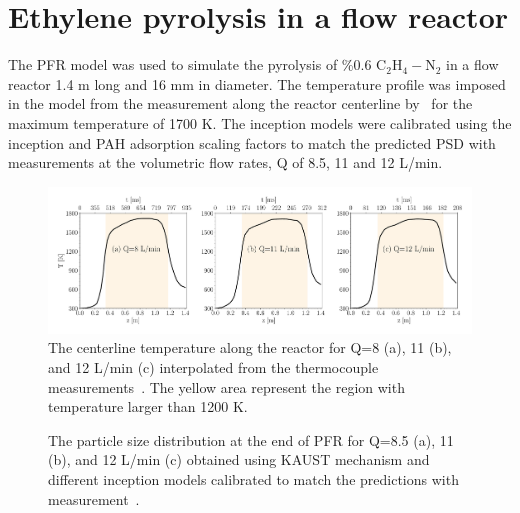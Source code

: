 \section{Ethylene pyrolysis in a flow reactor}
The PFR model was used to simulate the pyrolysis of \%0.6 $\mathrm{C_2H_4-N_2}$ in a flow reactor 1.4 m long and 16 mm in diameter. The temperature profile was imposed in the model from the measurement along the reactor centerline by~\citet{mei2019quantitative} for the maximum temperature of 1700 K. The inception models were calibrated using the inception and PAH adsorption scaling factors to match the predicted PSD with measurements at the volumetric flow rates, Q of 8.5, 11 and 12 L/min.

\begin{figure}[H]
	\centering
	\includegraphics[width=1\textwidth]{Figures/Results/PFR/temperature.pdf}
	\caption{The centerline temperature along the reactor for Q=8 (a), 11 (b), and 12 L/min (c) interpolated from the thermocouple measurements~\citep{mei2019quantitative}. The yellow area represent the region with temperature larger than 1200 K.}
	\label{fig:pfr_temp} 
\end{figure}

\begin{figure}[H]
	\centering
	\caption{The particle size distribution at the end of PFR for Q=8.5 (a), 11 (b), and 12 L/min (c) obtained using KAUST mechanism and different inception models calibrated to match the predictions with measurement~\citep{mei2019quantitative}.}
	\label{fig:pfr_psd} 
\end{figure}

